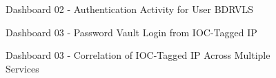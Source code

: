 \documentclass[11pt]{article}
\begin{document}
	\begin{figure}[h]
		\centering
		\caption{Dashboard 02 - Authentication Activity for User BDRVLS}
		\label{fig: B4}
	\end{figure}
	
	\begin{figure}[h]
		\centering
		\caption{Dashboard 03 - Password Vault Login from IOC-Tagged IP}
		\label{fig: B5}
	\end{figure}
	
	\begin{figure}[H]
		\centering
		\caption{Dashboard 03 - Correlation of IOC-Tagged IP Across Multiple Services}
		\label{fig: B6}
	\end{figure}
	

	
	
\end{document}

